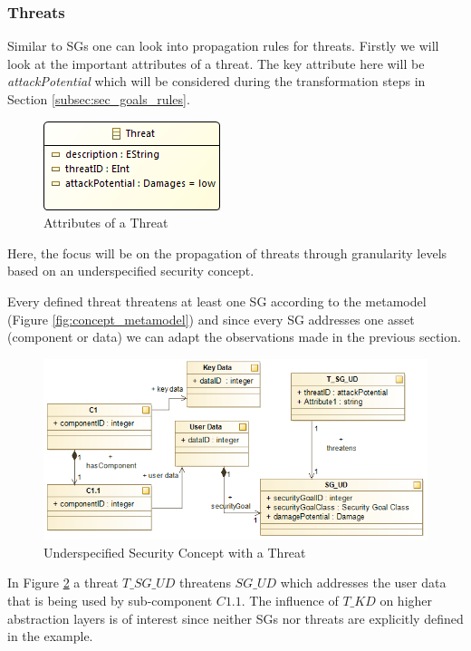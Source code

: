 \subsubsection*{Threats}

Similar to SGs one can look into propagation rules for threats. Firstly we will look at the important attributes of a threat. The key attribute here will be \textit{attackPotential} which will be considered during the transformation steps in Section \ref{subsec:sec_goals_rules}.  
 
\begin{figure}[H]
\centering
\includegraphics[scale=0.85]{pictures/threat.png}
\caption{Attributes of a Threat}
\label{fig:threat}
\end{figure} 

Here, the focus will be on the propagation of threats through granularity levels based on an underspecified security concept.

Every defined threat threatens at least one SG according to the metamodel (Figure \ref{fig:concept_metamodel}) and since every SG addresses one asset (component or data) we can adapt the observations made in the previous section. 

\begin{figure}[H]
\centering
\includegraphics[scale=0.85]{pictures/threat_overview.png}
\caption{Underspecified Security Concept with a Threat}
\label{fig:threat_overview}
\end{figure} 

In Figure \ref{fig:threat_overview} a threat $T\_SG\_UD$ threatens $SG\_UD$ which addresses the user data that is being used by sub-component $C1.1$. The influence of $T\_KD$ on higher abstraction layers is of interest since neither SGs nor threats are explicitly defined in the example.

